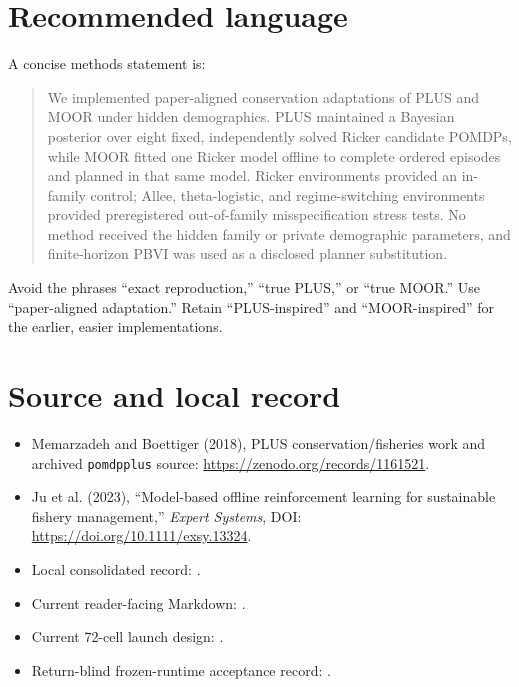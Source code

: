 \documentclass[11pt]{article}
\begin{document}
\section{Recommended language}

A concise methods statement is:

\begin{quote}
We implemented paper-aligned conservation adaptations of PLUS and MOOR under hidden demographics.
PLUS maintained a Bayesian posterior over eight fixed, independently solved Ricker candidate
POMDPs, while MOOR fitted one Ricker model offline to complete ordered episodes and planned in that
same model. Ricker environments provided an in-family control; Allee, theta-logistic, and
regime-switching environments provided preregistered out-of-family misspecification stress tests.
No method received the hidden family or private demographic parameters, and finite-horizon PBVI was
used as a disclosed planner substitution.
\end{quote}

Avoid the phrases ``exact reproduction,'' ``true PLUS,'' or ``true MOOR.'' Use ``paper-aligned
adaptation.'' Retain ``PLUS-inspired'' and ``MOOR-inspired'' for the earlier, easier implementations.

\section{Source and local record}

\begin{itemize}
  \item Memarzadeh and Boettiger (2018), PLUS conservation/fisheries work and archived
  \texttt{pomdpplus} source: \url{https://zenodo.org/records/1161521}.
  \item Ju et al. (2023), ``Model-based offline reinforcement learning for sustainable fishery
  management,'' \emph{Expert Systems}, DOI: \url{https://doi.org/10.1111/exsy.13324}.
  \item Local consolidated record:
  .
  \item Current reader-facing Markdown:
  .
  \item Current 72-cell launch design: .
  \item Return-blind frozen-runtime acceptance record:
  .
\end{itemize}
\end{document}
